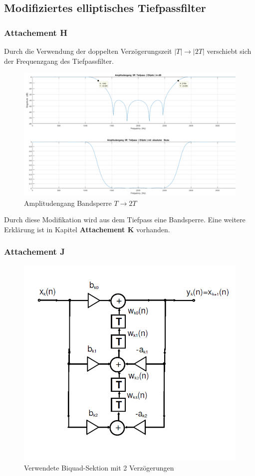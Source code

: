 \clearpage

\subsection{Modifiziertes elliptisches Tiefpassfilter}
\subsubsection{Attachement H}
\noindent Durch die Verwendung der doppelten Verzögerungszeit $|T| \rightarrow |2T|$ verschiebt sich der Frequenzgang des Tiefpassfilter.

\begin{figure}[h]
\centering
\includegraphics[width=0.7\linewidth]{./Bilder/Attachment_H_ELLIP_STOP}
\caption{Amplitudengang Bandsperre $T \rightarrow 2T$}
\label{fig:Attachment_H_ELLIP_STOP}
\end{figure}

\noindent Durch diese Modifikation wird aus dem Tiefpass eine Bandsperre. Eine weitere Erklärung ist in Kapitel \textbf{Attachement K} vorhanden.

\clearpage

\subsubsection{Attachement J}

\begin{figure}[h]
\centering
\includegraphics[width=0.7\linewidth]{Bilder/Biquad2T}
\caption{Verwendete Biquad-Sektion mit 2 Verzögerungen}
\label{fig:Biquad2T}
\end{figure}

